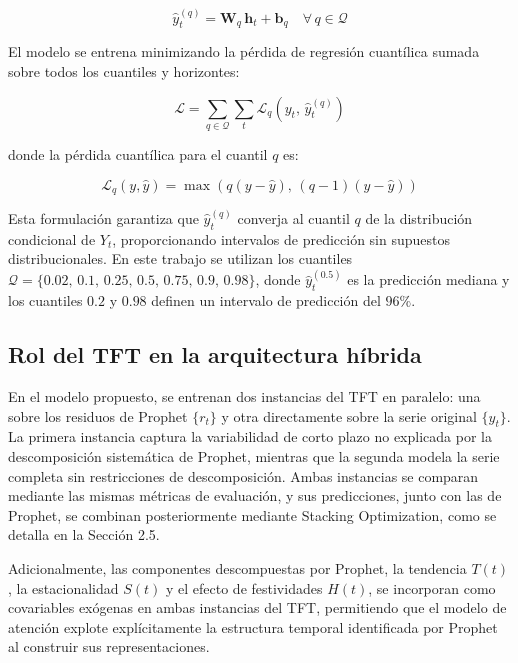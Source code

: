 \begin{equation}
\hat{y}_t^{(q)} = \mathbf{W}_q \, \mathbf{h}_t + \mathbf{b}_q \quad \forall\, q \in \mathcal{Q}
\end{equation}

El modelo se entrena minimizando la pérdida de regresión cuantílica sumada sobre todos los cuantiles y horizontes:

\begin{equation}
\mathcal{L} = \sum_{q \in \mathcal{Q}} \sum_{t} \mathcal{L}_q\left(y_t, \, \hat{y}_t^{(q)}\right)
\end{equation}

donde la pérdida cuantílica para el cuantil $q$ es:

\begin{equation}
\mathcal{L}_q(y, \hat{y}) = \max\left(q(y - \hat{y}), \, (q-1)(y - \hat{y})\right)
\end{equation}

Esta formulación garantiza que $\hat{y}_t^{(q)}$ converja al cuantil $q$ de la distribución condicional de $Y_t$, proporcionando intervalos de predicción sin supuestos distribucionales. En este trabajo se utilizan los cuantiles $\mathcal{Q} = \{0{.}02, \,0{.}1, \, 0{.}25, \, 0{.}5, \, 0{.}75, \, 0{.}9, \, 0{.}98\}$, donde $\hat{y}_t^{(0{.}5)}$ es la predicción mediana y los cuantiles $0{.}2$ y $0{.}98$ definen un intervalo de predicción del $96\%$.

\subsection{Rol del TFT en la arquitectura híbrida}

En el modelo propuesto, se entrenan dos instancias del TFT en paralelo: una sobre los residuos de Prophet $\{r_t\}$ y otra directamente sobre la serie original $\{y_t\}$. La primera instancia captura la variabilidad de corto plazo no explicada por la descomposición sistemática de Prophet, mientras que la segunda modela la serie completa sin restricciones de descomposición. Ambas instancias se comparan mediante las mismas métricas de evaluación, y sus predicciones, junto con las de Prophet, se combinan posteriormente mediante Stacking Optimization, como se detalla en la Sección 2.5.

Adicionalmente, las componentes descompuestas por Prophet, la tendencia $T(t)$, la estacionalidad $S(t)$ y el efecto de festividades $H(t)$, se incorporan como covariables exógenas en ambas instancias del TFT, permitiendo que el modelo de atención explote explícitamente la estructura temporal identificada por Prophet al construir sus representaciones.